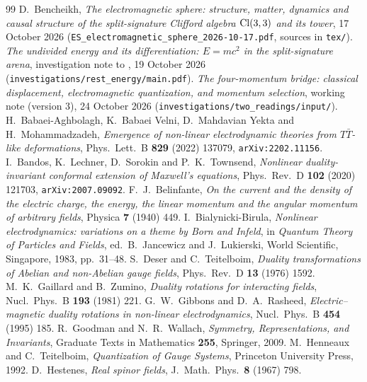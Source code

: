 \begin{thebibliography}{99}
 D.~Bencheikh, \emph{The electromagnetic sphere: structure, matter, dynamics and causal structure of the split-signature
Clifford algebra $\mathrm{Cl}(3,3)$ and its tower}, 17 October 2026 (\texttt{ES\_electromagnetic\_sphere\_2026-10-17.pdf}, sources in \texttt{tex/}).
 \emph{The undivided energy and its differentiation: $E=mc^2$ in the split-signature arena}, investigation note to \cite{ES17}, 19 October 2026 (\texttt{investigations/rest\_energy/main.pdf}).
 \emph{The four-momentum bridge: classical displacement, electromagnetic quantization, and momentum selection}, working note (version 3), 24 October 2026 (\texttt{investigations/two\_readings/input/}).
 H.~Babaei-Aghbolagh, K.~Babaei Velni, D.~Mahdavian Yekta and H.~Mohammadzadeh, \emph{Emergence of non-linear
electrodynamic theories from $T\bar T$-like deformations}, Phys.~Lett.~B \textbf{829} (2022) 137079, \texttt{arXiv:2202.11156}.
 I.~Bandos, K.~Lechner, D.~Sorokin and P.~K.~Townsend, \emph{Nonlinear duality-invariant conformal
extension of Maxwell's equations}, Phys.~Rev.~D \textbf{102} (2020) 121703, \texttt{arXiv:2007.09092}.
 F.~J.~Belinfante, \emph{On the current and the density of the electric charge, the energy, the linear momentum and the
angular momentum of arbitrary fields}, Physica \textbf{7} (1940) 449.
 I.~Bialynicki-Birula, \emph{Nonlinear electrodynamics: variations on a theme by Born and Infeld}, in
\emph{Quantum Theory of Particles and Fields}, ed.~B.~Jancewicz and J.~Lukierski, World Scientific, Singapore, 1983, pp.~31--48.
 S.~Deser and C.~Teitelboim, \emph{Duality transformations of Abelian and non-Abelian gauge fields}, Phys.~Rev.~D \textbf{13} (1976) 1592.
 M.~K.~Gaillard and B.~Zumino, \emph{Duality rotations for interacting fields}, Nucl.~Phys.~B \textbf{193} (1981) 221.
 G.~W.~Gibbons and D.~A.~Rasheed, \emph{Electric--magnetic duality rotations in non-linear electrodynamics}, Nucl.~Phys.~B \textbf{454} (1995) 185.
 R.~Goodman and N.~R.~Wallach, \emph{Symmetry, Representations, and Invariants}, Graduate Texts in Mathematics \textbf{255}, Springer, 2009.
 M.~Henneaux and C.~Teitelboim, \emph{Quantization of Gauge Systems}, Princeton University Press, 1992.
 D.~Hestenes, \emph{Real spinor fields}, J.~Math.~Phys.~\textbf{8} (1967) 798.

\end{thebibliography}
